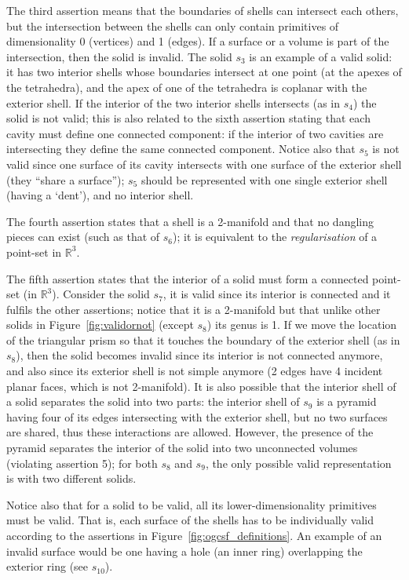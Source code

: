The third assertion means that the boundaries of shells can intersect each others, but the intersection between the shells can only contain primitives of dimensionality 0 (vertices) and 1 (edges).
If a surface or a volume is part of the intersection, then the solid is invalid.
The solid $s_3$ is an example of a valid solid: it has two interior shells whose boundaries intersect at one point (at the apexes of the tetrahedra), and the apex of one of the tetrahedra is coplanar with the exterior shell.
If the interior of the two interior shells intersects (as in $s_4$) the solid is not valid; this is also related to the sixth assertion stating that each cavity must define one connected component: if the interior of two cavities are intersecting they define the same connected component.
Notice also that $s_5$ is not valid since one surface of its cavity intersects with one surface of the exterior shell (they ``share a surface''); $s_5$ should be represented with one single exterior shell (having a `dent'), and no interior shell.

The fourth assertion states that a shell is a 2-manifold and that no dangling pieces can exist (such as that of $s_6$); it is equivalent to the \emph{regularisation} of a point-set in $\mathbb{R}^3$.

The fifth assertion states that the interior of a solid must form a connected point-set (in $\mathbb{R}^3$).
Consider the solid $s_7$, it is valid since its interior is connected and it fulfils the other assertions; notice that it is a 2-manifold but that unlike other solids in Figure~\ref{fig:validornot} (except $s_8$) its genus is 1.
If we move the location of the triangular prism so that it touches the boundary of the exterior shell (as in $s_8$), then the solid becomes invalid since its interior is not connected anymore, and also since its exterior shell is not simple anymore (2 edges have 4 incident planar faces, which is not 2-manifold).
It is also possible that the interior shell of a solid separates the solid into two parts: the interior shell of $s_9$ is a pyramid having four of its edges intersecting with the exterior shell, but no two surfaces are shared, thus these interactions are allowed.
However, the presence of the pyramid separates the interior of the solid into two unconnected volumes (violating assertion 5); for both $s_8$ and $s_9$, the only possible valid representation is with two different solids.

Notice also that for a solid to be valid, all its lower-dimensionality primitives must be valid.
That is, each surface of the shells has to be individually valid according to the assertions in Figure~\ref{fig:ogcsf_definitions}.
An example of an invalid surface would be one having a hole (an inner ring) overlapping the exterior ring (see $s_{10}$).

